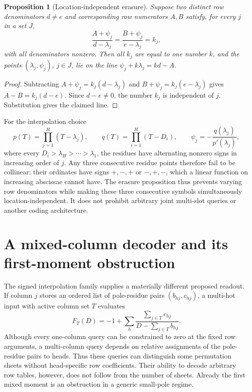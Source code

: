 \documentclass[11pt]{article}
\newtheorem{proposition}{Proposition}
\begin{document}
\begin{proposition}[Location-independent erasure]
Suppose two distinct row denominators $d\ne e$ and corresponding row
numerators $A,B$ satisfy, for every $j$ in a set $J$,
\[
 \frac{A+\psi_j}{d-\lambda_j}
 =\frac{B+\psi_j}{e-\lambda_j}=k_j,
\]
with all denominators nonzero. Then all $k_j$ are equal to one number
$k$, and the points $(\lambda_j,\psi_j)$, $j\in J$, lie on the line
$\psi_j+k\lambda_j=kd-A$.
\end{proposition}
\begin{proof}
Subtracting $A+\psi_j=k_j(d-\lambda_j)$ and
$B+\psi_j=k_j(e-\lambda_j)$ gives
$A-B=k_j(d-e)$. Since $d-e\ne0$, the number $k_j$ is independent
of $j$. Substitution gives the claimed line.
\end{proof}

For the interpolation choice
\[
 p(T)=\prod_{j=1}^H(T-\lambda_j),\qquad
 q(T)=\prod_{i=1}^H(T-D_i),\qquad
 \psi_j=-\frac{q(\lambda_j)}{p'(\lambda_j)},
\]
where every $D_i>\lambda_H>\cdots>\lambda_1$, the residues have
alternating nonzero signs in increasing order of $j$. Any three
consecutive residue points therefore fail to be collinear: their
ordinates have signs $+,-,+$ or $-,+,-$, which a linear function
on increasing abscissae cannot have. The erasure proposition thus
prevents varying row denominators while making these three consecutive
symbols simultaneously location-independent. It does not prohibit
arbitrary joint multi-slot queries or another coding architecture.

\section{A mixed-column decoder and its first-moment obstruction}
The signed interpolation family supplies a materially different proposed
readout. If column $j$ stores an ordered list of pole-residue pairs
$(b_{hj},c_{hj})$, a multi-hot input with active column set $T$ evaluates
\[
 F_T(D)=-1+\sum_h\frac{\sum_{j\in T}c_{hj}}
 {D-\sum_{j\in T}b_{hj}}.
\]
Although every one-column query can be constrained to zero at the fixed
row arguments, a multi-column query depends on relative assignments of
the pole-residue pairs to heads. Thus these queries can distinguish
some permutation sheets without head-specific row coefficients.
Their ability to decode arbitrary row tables, however, does not follow
from the number of sheets. Already the first mixed moment is an
obstruction in a generic small-pole regime.
\end{document}
